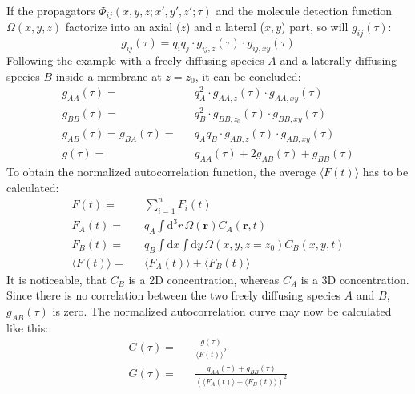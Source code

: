 	\newline
	\newline
	If the propagators $\Phi_{ij}(x,y,z; x',y',z'; \tau)$ and the molecule detection function $\Omega(x,y,z)$ factorize into an axial ($z$) and a lateral ($x,y$) part, so will $g_{ij}(\tau)$:
	\begin{equation}
	g_{ij}(\tau) = q_i q_j \cdot g_{ij,z}(\tau) \cdot g_{ij,xy}(\tau)
	\end{equation}
	Following the example with a freely diffusing species $A$ and a laterally diffusing species $B$ inside a membrane at $z = z_0$, it can be concluded:
	\begin{eqnarray*}
	g_{AA}(\tau) = && q_A^2 \cdot g_{AA,z}(\tau) \cdot g_{AA,xy}(\tau) \\
	g_{BB}(\tau) = && q_B^2 \cdot g_{BB,z_0}(\tau) \cdot g_{BB,xy}(\tau) \\
	g_{AB}(\tau) = g_{BA} (\tau) = && q_A q_B \cdot g_{AB,z}(\tau) \cdot g_{AB,xy}(\tau)  \\
	g(\tau) = && g_{AA}(\tau) + 2 g_{AB}(\tau) + g_{BB}(\tau)
	\end{eqnarray*}
	To obtain the normalized autocorrelation function, the average $\langle F(t) \rangle$ has to be calculated:
	\begin{eqnarray*}
	F(t) = && \sum_{i=1}^n F_i(t) \\
	F_A(t) = && q_A \int \! \mathrm{d}^3 r \, \Omega(\mathbf{r}) C_A(\mathbf{r}, t) \\
	F_B(t) = && q_B \int \! \mathrm{d}x \! \int \! \mathrm{d}y \, \Omega(x,y,z=z_0) C_B(x,y, t)  \\
	\langle F(t) \rangle = && \langle F_A(t) \rangle + \langle F_B(t) \rangle
	\end{eqnarray*}
	It is noticeable, that $C_B$ is a 2D concentration, whereas $C_A$ is a 3D concentration. Since there is no correlation between the two freely diffusing species $A$ and $B$, $g_{AB}(\tau)$ is zero. The normalized autocorrelation curve may now be calculated like this:
	\begin{eqnarray*}
	G(\tau) = && \frac{g(\tau)}{\langle F(t) \rangle^2} \\
	G(\tau) = && \frac{g_{AA}(\tau) + g_{BB}(\tau)}{(\langle F_A(t) \rangle + \langle F_B(t) \rangle)^2} \\
	\end{eqnarray*}

